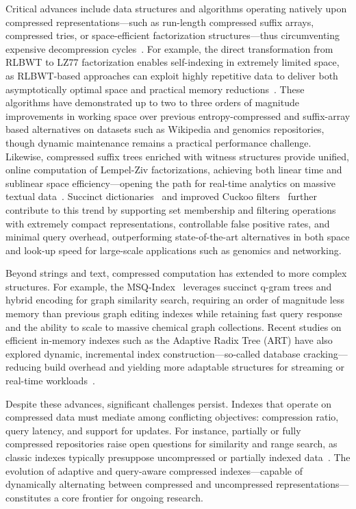 \documentclass[sigconf]{acmart}
\begin{document}
Critical advances include data structures and algorithms operating natively upon compressed representations—such as run-length compressed suffix arrays, compressed tries, or space-efficient factorization structures—thus circumventing expensive decompression cycles~\cite{ref80,ref81,ref82,ref87,ref106,ref108,ref109,ref118}. For example, the direct transformation from RLBWT to LZ77 factorization enables self-indexing in extremely limited space, as RLBWT-based approaches can exploit highly repetitive data to deliver both asymptotically optimal space and practical memory reductions~\cite{ref80}. These algorithms have demonstrated up to two to three orders of magnitude improvements in working space over previous entropy-compressed and suffix-array based alternatives on datasets such as Wikipedia and genomics repositories, though dynamic maintenance remains a practical performance challenge. Likewise, compressed suffix trees enriched with witness structures provide unified, online computation of Lempel-Ziv factorizations, achieving both linear time and sublinear space efficiency—opening the path for real-time analytics on massive textual data~\cite{ref81}. Succinct dictionaries~\cite{ref82} and improved Cuckoo filters~\cite{ref87} further contribute to this trend by supporting set membership and filtering operations with extremely compact representations, controllable false positive rates, and minimal query overhead, outperforming state-of-the-art alternatives in both space and look-up speed for large-scale applications such as genomics and networking.

Beyond strings and text, compressed computation has extended to more complex structures. For example, the MSQ-Index~\cite{ref106} leverages succinct q-gram trees and hybrid encoding for graph similarity search, requiring an order of magnitude less memory than previous graph editing indexes while retaining fast query response and the ability to scale to massive chemical graph collections. Recent studies on efficient in-memory indexes such as the Adaptive Radix Tree (ART) have also explored dynamic, incremental index construction—so-called database cracking—reducing build overhead and yielding more adaptable structures for streaming or real-time workloads~\cite{ref109}.

Despite these advances, significant challenges persist. Indexes that operate on compressed data must mediate among conflicting objectives: compression ratio, query latency, and support for updates. For instance, partially or fully compressed repositories raise open questions for similarity and range search, as classic indexes typically presuppose uncompressed or partially indexed data~\cite{ref118}. The evolution of adaptive and query-aware compressed indexes—capable of dynamically alternating between compressed and uncompressed representations—constitutes a core frontier for ongoing research.
\end{document}
